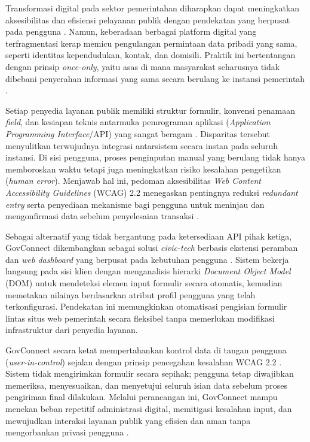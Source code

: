 \documentclass[conference]{IEEEtran}
\begin{document}
Transformasi digital pada sektor pemerintahan diharapkan dapat meningkatkan aksesibilitas dan efisiensi pelayanan publik dengan pendekatan yang berpusat pada pengguna \cite{OECD2022DigitalServices,OECD2022Principles}. Namun, keberadaan berbagai platform digital yang terfragmentasi kerap memicu pengulangan permintaan data pribadi yang sama, seperti identitas kependudukan, kontak, dan domisili. Praktik ini bertentangan dengan prinsip \textit{once-only}, yaitu asas di mana masyarakat seharusnya tidak dibebani penyerahan informasi yang sama secara berulang ke instansi pemerintah \cite{OECD2026DGO,OECD2022Principles}.

Setiap penyedia layanan publik memiliki struktur formulir, konvensi penamaan \textit{field}, dan kesiapan teknis antarmuka pemrograman aplikasi (\textit{Application Programming Interface}/API) yang sangat beragam \cite{OECD2026DGO}. Disparitas tersebut menyulitkan terwujudnya integrasi antarsistem secara instan pada seluruh instansi. Di sisi pengguna, proses penginputan manual yang berulang tidak hanya memboroskan waktu tetapi juga meningkatkan risiko kesalahan pengetikan (\textit{human error}). Menjawab hal ini, pedoman aksesibilitas \textit{Web Content Accessibility Guidelines} (WCAG) 2.2 menegaskan pentingnya reduksi \textit{redundant entry} serta penyediaan mekanisme bagi pengguna untuk meninjau dan mengonfirmasi data sebelum penyelesaian transaksi \cite{W3C2023WCAG}.

Sebagai alternatif yang tidak bergantung pada ketersediaan API pihak ketiga, GovConnect dikembangkan sebagai solusi \textit{civic-tech} berbasis ekstensi peramban dan \textit{web dashboard} yang berpusat pada kebutuhan pengguna \cite{OECD2022Principles}. Sistem bekerja langsung pada sisi klien dengan menganalisis hierarki \textit{Document Object Model} (DOM) untuk mendeteksi elemen input formulir secara otomatis, kemudian memetakan nilainya berdasarkan atribut profil pengguna yang telah terkonfigurasi. Pendekatan ini memungkinkan otomatisasi pengisian formulir lintas situs web pemerintah secara fleksibel tanpa memerlukan modifikasi infrastruktur dari penyedia layanan.

GovConnect secara ketat mempertahankan kontrol data di tangan pengguna (\textit{user-in-control}) sejalan dengan prinsip pencegahan kesalahan WCAG 2.2 \cite{W3C2023WCAG}. Sistem tidak mengirimkan formulir secara sepihak; pengguna tetap diwajibkan memeriksa, menyesuaikan, dan menyetujui seluruh isian data sebelum proses pengiriman final dilakukan. Melalui perancangan ini, GovConnect mampu menekan beban repetitif administrasi digital, memitigasi kesalahan input, dan mewujudkan interaksi layanan publik yang efisien dan aman tanpa mengorbankan privasi pengguna \cite{OECD2022Principles,OECD2026DGO}.
\end{document}
